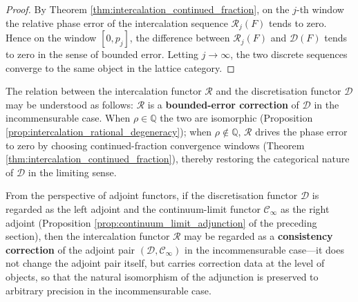 \begin{proof}
By Theorem \ref{thm:intercalation_continued_fraction}, on the $j$-th window the relative phase error of the intercalation sequence $\mathcal{R}_j(F)$ tends to zero. Hence on the window $[0,p_j]$, the difference between $\mathcal{R}_j(F)$ and $\mathcal{D}(F)$ tends to zero in the sense of bounded error. Letting $j\to\infty$, the two discrete sequences converge to the same object in the lattice category.
\end{proof}

\begin{remark}\label{rem:intercalation_category_status}
The relation between the intercalation functor $\mathcal{R}$ and the discretisation functor $\mathcal{D}$ may be understood as follows: $\mathcal{R}$ is a \textbf{bounded-error correction} of $\mathcal{D}$ in the incommensurable case. When $\rho\in\mathbb{Q}$ the two are isomorphic (Proposition \ref{prop:intercalation_rational_degeneracy}); when $\rho\notin\mathbb{Q}$, $\mathcal{R}$ drives the phase error to zero by choosing continued-fraction convergence windows (Theorem \ref{thm:intercalation_continued_fraction}), thereby restoring the categorical nature of $\mathcal{D}$ in the limiting sense.

From the perspective of adjoint functors, if the discretisation functor $\mathcal{D}$ is regarded as the left adjoint and the continuum-limit functor $\mathcal{C}_\infty$ as the right adjoint (Proposition \ref{prop:continuum_limit_adjunction} of the preceding section), then the intercalation functor $\mathcal{R}$ may be regarded as a \textbf{consistency correction} of the adjoint pair $(\mathcal{D},\mathcal{C}_\infty)$ in the incommensurable case---it does not change the adjoint pair itself, but carries correction data at the level of objects, so that the natural isomorphism of the adjunction is preserved to arbitrary precision in the incommensurable case.
\end{remark}

